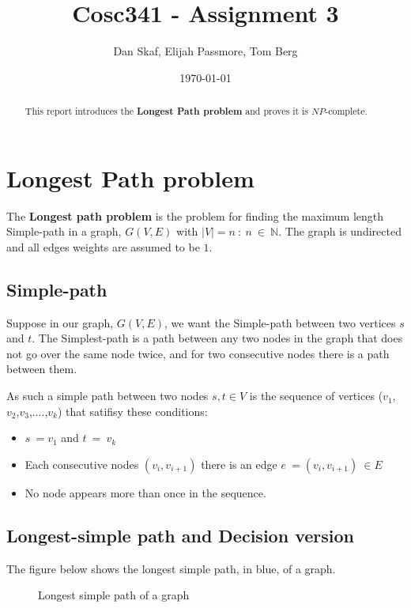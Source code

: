 \documentclass[a4paper,11pt]{article}
\title{Cosc341 - Assignment 3}
\author{Dan Skaf, Elijah Passmore, Tom Berg}
\date{\today}
\begin{document}
\maketitle

\begin{abstract}
This report introduces the \textbf{Longest Path problem} and proves it is $NP$-complete.
\end{abstract}

\section{Longest Path problem}
The \textbf{Longest path problem} is the problem for finding the maximum length 
Simple-path in a graph, $G(V,E)$ with $\left|V\right|=n\::\:n\:\in\:\mathbb{N}$.
The graph is undirected and all edges weights are assumed to be $1$.

    \subsection{Simple-path} 
    Suppose in our graph, $G(V,E)$, we want the Simple-path between two vertices 
    $s$ and $t$. The Simplest-path is a path between any two nodes in the graph 
    that does not go over the same node twice, and for two consecutive nodes 
    there is a path between them.

    As such a simple path between two nodes $s,t\in V$ is the sequence of 
    vertices ($v_1$,$v_2$,$v_3$,$....$,$v_k$) that satifisy these conditions:
    \begin{itemize}
        \item $s\:=v_1$ and $t\:=\:v_k$
        \item Each consecutive nodes $\left(v_i,v_{i+1}\right)$ there is an 
        edge $e\:=\left(v_i,v_{i+1}\right)\:\in E$
        \item No node appears more than once in the sequence.
    \end{itemize}
    \pagebreak

    \subsection{Longest-simple path and Decision version}
    The figure below shows the longest simple path, in blue, of a graph.
    \begin{figure}[!h]
        \centering {}
        \caption{Longest simple path of a graph}
    \end{figure}
\end{document}
